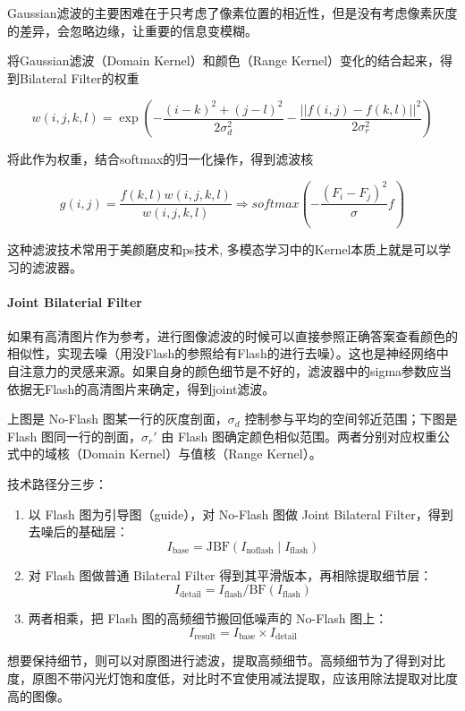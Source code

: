 \documentclass{ctexart}
\begin{document}
Gaussian滤波的主要困难在于只考虑了像素位置的相近性，但是没有考虑像素灰度的差异，会忽略边缘，让重要的信息变模糊。

将Gaussian滤波（Domain Kernel）和颜色（Range Kernel）变化的结合起来，得到Bilateral Filter的权重

\[
w (i,j,k,l) = \exp(-\frac{(i-k)^2+(j-l)^2}{2\sigma_{d}^{2}}-\frac{||f(i,j) - f(k,l)||^2}{2\sigma_{r}^{2}})
\]

将此作为权重，结合softmax的归一化操作，得到滤波核

\[
g(i,j) = \frac{f(k,l)w(i,j,k,l)}{w(i,j,k,l)} \Rightarrow softmax(-\frac{(F_i-F_j)^2}{\sigma}f)
\]

这种滤波技术常用于美颜磨皮和ps技术, 多模态学习中的Kernel本质上就是可以学习的滤波器。

\paragraph{Joint Bilaterial Filter}

如果有高清图片作为参考，进行图像滤波的时候可以直接参照正确答案查看颜色的相似性，实现去噪（用没Flash的参照给有Flash的进行去噪）。这也是神经网络中自注意力的灵感来源。如果自身的颜色细节是不好的，滤波器中的sigma参数应当依据无Flash的高清图片来确定，得到joint滤波。

上图是 No-Flash 图某一行的灰度剖面，$\sigma_d$ 控制参与平均的空间邻近范围；下图是 Flash 图同一行的剖面，$\sigma_r'$ 由 Flash 图确定颜色相似范围。两者分别对应权重公式中的域核（Domain Kernel）与值核（Range Kernel）。

技术路径分三步：

\begin{enumerate}[label=\arabic*.]
    \item 以 Flash 图为引导图（guide），对 No-Flash 图做 Joint Bilateral Filter，得到去噪后的基础层：
    \[
    I_{\mathrm{base}} = \mathrm{JBF}(I_{\mathrm{noflash}} \mid I_{\mathrm{flash}})
    \]
    \item 对 Flash 图做普通 Bilateral Filter 得到其平滑版本，再相除提取细节层：
    \[
    I_{\mathrm{detail}} = I_{\mathrm{flash}} / \mathrm{BF}(I_{\mathrm{flash}})
    \]
    \item 两者相乘，把 Flash 图的高频细节搬回低噪声的 No-Flash 图上：
    \[
    I_{\mathrm{result}} = I_{\mathrm{base}} \times I_{\mathrm{detail}}
    \]
\end{enumerate}

想要保持细节，则可以对原图进行滤波，提取高频细节。高频细节为了得到对比度，原图不带闪光灯饱和度低，对比时不宜使用减法提取，应该用除法提取对比度高的图像。
\end{document}
